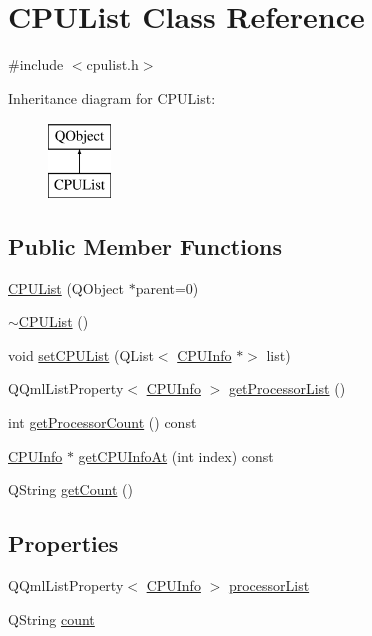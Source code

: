 \hypertarget{class_c_p_u_list}{}\section{C\+P\+U\+List Class Reference}
\label{class_c_p_u_list}


{\ttfamily \#include $<$cpulist.\+h$>$}

Inheritance diagram for C\+P\+U\+List\+:\begin{figure}[H]
\begin{center}
\leavevmode
\includegraphics[height=2.000000cm]{class_c_p_u_list}
\end{center}
\end{figure}
\subsection*{Public Member Functions}
\begin{DoxyCompactItemize}
\item 
\hyperlink{class_c_p_u_list_af8d85299bb17bcd5f1989a907337c0d9}{C\+P\+U\+List} (Q\+Object $\ast$parent=0)
\item 
\hyperlink{class_c_p_u_list_a78f76d52368f52ca8466a7ed1f1a05b4}{$\sim$\+C\+P\+U\+List} ()
\item 
void \hyperlink{class_c_p_u_list_a9423eef0f279d40de6674857ded63907}{set\+C\+P\+U\+List} (Q\+List$<$ \hyperlink{class_c_p_u_info}{C\+P\+U\+Info} $\ast$$>$ list)
\item 
Q\+Qml\+List\+Property$<$ \hyperlink{class_c_p_u_info}{C\+P\+U\+Info} $>$ \hyperlink{class_c_p_u_list_a6d135eed8d40bfbb913e24848093f3ee}{get\+Processor\+List} ()
\item 
int \hyperlink{class_c_p_u_list_af608bafb0800d5bf5feb9bb2c008f1a9}{get\+Processor\+Count} () const
\item 
\hyperlink{class_c_p_u_info}{C\+P\+U\+Info} $\ast$ \hyperlink{class_c_p_u_list_a89903282b11ae6199d18907b0a4e6af3}{get\+C\+P\+U\+Info\+At} (int index) const
\item 
Q\+String \hyperlink{class_c_p_u_list_a0c172aa998f014f8b01e4a9fd79bb57a}{get\+Count} ()
\end{DoxyCompactItemize}
\subsection*{Properties}
\begin{DoxyCompactItemize}
\item 
Q\+Qml\+List\+Property$<$ \hyperlink{class_c_p_u_info}{C\+P\+U\+Info} $>$ \hyperlink{class_c_p_u_list_a20c077d0f79d4e2fb2141f8aa62950b1}{processor\+List}
\item 
Q\+String \hyperlink{class_c_p_u_list_aa463c60e042b1bd36b18b82cec3b08bc}{count}
\end{DoxyCompactItemize}



